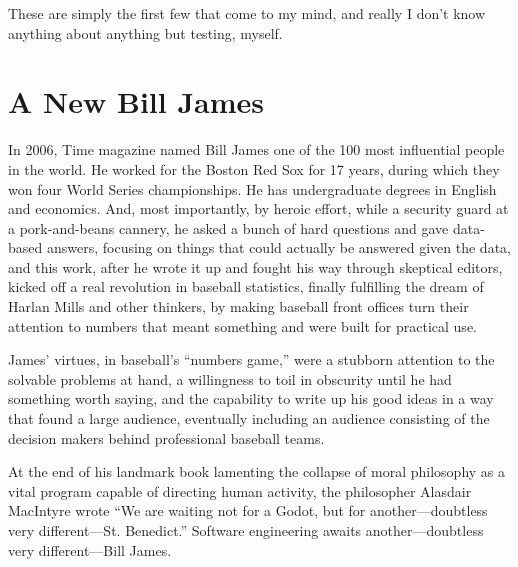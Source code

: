 \documentclass[sigplan,screen]{acmart}
\begin{document}
 These are simply the first few that come to my mind, and really I
 don't know anything about anything but testing, myself.

 \section{A New Bill James}

 In 2006, Time magazine named Bill James one of the 100
 most influential people in the world.  He worked for the Boston Red
 Sox for 17 years, during which they won four World Series
 championships.  He has undergraduate degrees in English and
 economics.  And, most importantly, by heroic effort, while a security
 guard at a pork-and-beans cannery, he asked a bunch of hard questions
 and gave data-based answers, focusing on things that could actually
 be answered given the data, and this work, after he wrote it up and
 fought his way through skeptical editors, kicked off a real
 revolution in baseball statistics, finally fulfilling the dream of
 Harlan Mills and other thinkers, by making baseball front offices turn their
 attention to numbers that meant something and were built for
 practical use.

 James' virtues, in baseball's ``numbers game,'' were a stubborn attention to the
 solvable problems at hand, a willingness to toil in obscurity until
 he had something worth saying, and
 the capability to write up his good ideas in a way that found a large
 audience, eventually including an audience consisting of the decision
 makers behind professional baseball teams.

 At the end of  his landmark book lamenting the collapse of moral
 philosophy as a vital program capable of directing human activity,
 the philosopher Alasdair MacIntyre wrote ``We are waiting not for a
 Godot, but for another---doubtless very different---St. Benedict.''
 Software engineering awaits another---doubtless very different---Bill James.



\end{document}
